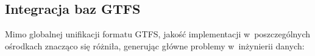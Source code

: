 \documentclass{pracamgr}
\begin{document}
%
%
%

\subsection{Integracja baz GTFS}

Mimo globalnej unifikacji formatu GTFS, jakość implementacji w~poszczególnych ośrodkach znacząco się różniła, generując główne problemy w~inżynierii danych:
\end{document}
